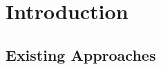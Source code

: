 \documentclass[useAMS,referee]{biom}
\begin{document}

\maketitle

\setcounter{tocdepth}{3}
\tableofcontents

\newpage


%

\section{Introduction}
\label{s:intro}

\subsection{Existing Approaches}
\end{document}
